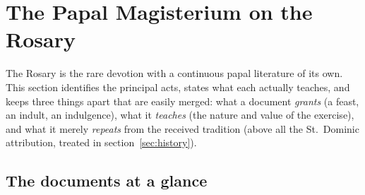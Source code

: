 \section{The Papal Magisterium on the Rosary}
\label{sec:magisterium}

The Rosary is the rare devotion with a continuous papal literature of
its own. This section identifies the principal acts, states what each
actually teaches, and keeps three things apart that are easily merged:
what a document \emph{grants} (a feast, an indult, an indulgence), what
it \emph{teaches} (the nature and value of the exercise), and what it
merely \emph{repeats} from the received tradition (above all the
St.~Dominic attribution, treated in section~\ref{sec:history}).

\subsection{The documents at a glance}


